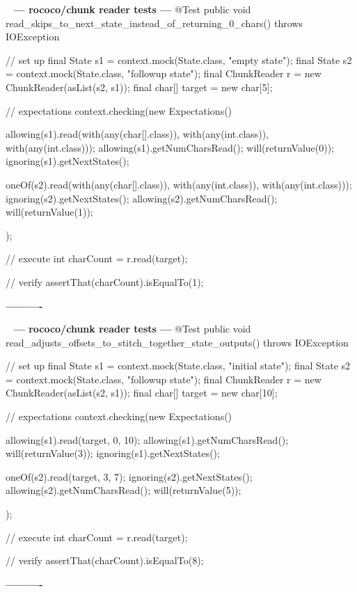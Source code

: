 \documentclass{book}
\newenvironment{chunk}[1]{%
{\ }\newline\noindent%
\hbox{\hskip 2.0cm}{\bf --- #1 ---}%
\verbatim}%                               say exactly what we see
{\endverbatim%
\par{}%
\noindent{}%
\hbox{\hskip 2.0cm}{\bf ----------}%
\par%
\normalsize\noindent}%
\begin{document}
\begin{chunk}{rococo/chunk reader tests}
@Test
public void read_skips_to_next_state_instead_of_returning_0_chars() throws IOException {
    // set up
    final State s1 = context.mock(State.class, "empty state");
    final State s2 = context.mock(State.class, "followup state");
    final ChunkReader r = new ChunkReader(asList(s2, s1));
    final char[] target = new char[5];

    // expectations
    context.checking(new Expectations() {{
        allowing(s1).read(with(any(char[].class)), with(any(int.class)), with(any(int.class)));
        allowing(s1).getNumCharsRead();
        will(returnValue(0));
        ignoring(s1).getNextStates();

        oneOf(s2).read(with(any(char[].class)), with(any(int.class)), with(any(int.class)));
        ignoring(s2).getNextStates();
        allowing(s2).getNumCharsRead();
        will(returnValue(1));
    }});

    // execute
    int charCount = r.read(target);

    // verify
    assertThat(charCount).isEqualTo(1);
}
\end{chunk}

\begin{chunk}{rococo/chunk reader tests}
@Test
public void read_adjusts_offsets_to_stitch_together_state_outputs() throws IOException {
    // set up
    final State s1 = context.mock(State.class, "initial state");
    final State s2 = context.mock(State.class, "followup state");
    final ChunkReader r = new ChunkReader(asList(s2, s1));
    final char[] target = new char[10];

    // expectations
    context.checking(new Expectations() {{
        allowing(s1).read(target, 0, 10);
        allowing(s1).getNumCharsRead();
        will(returnValue(3));
        ignoring(s1).getNextStates();

        oneOf(s2).read(target, 3, 7);
        ignoring(s2).getNextStates();
        allowing(s2).getNumCharsRead();
        will(returnValue(5));
    }});

    // execute
    int charCount = r.read(target);

    // verify
    assertThat(charCount).isEqualTo(8);
}
\end{chunk}
\end{document}
